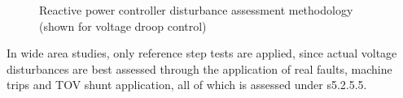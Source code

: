\begin{figure}[H]
	\centering
	
	\caption{Reactive power controller disturbance assessment methodology (shown for voltage droop control)}
	\label{fig:smib-vref-change-diagram}
\end{figure}

In wide area studies, only reference step tests are applied, since actual voltage disturbances are best assessed through the application of real faults, machine trips and \ac{TOV} shunt application, all of which is assessed under s5.2.5.5.

